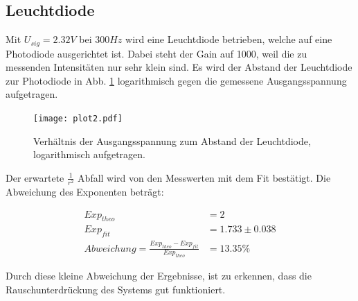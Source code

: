 \subsection{Leuchtdiode}
\label{sec:Leuchtdiode}

Mit $U_{sig} = 2.32 V$ bei $300 Hz$ wird eine Leuchtdiode betrieben, welche auf eine Photodiode ausgerichtet ist.
Dabei steht der Gain auf 1000, weil die zu messenden Intensitäten nur sehr klein sind.
Es wird der Abstand der Leuchtdiode zur Photodiode in Abb. \ref{fig:plot2} logarithmisch gegen die gemessene Ausgangsspannung aufgetragen.

\begin{figure}
  \centering
  \texttt{[image: plot2.pdf]}
  \caption{Verhältnis der Ausgangsspannung zum Abstand der Leuchtdiode, logarithmisch aufgetragen.}
  \label{fig:plot2}
\end{figure}

Der erwartete $\frac{1}{r^2}$ Abfall wird von den Messwerten mit dem Fit bestätigt.
Die Abweichung des Exponenten beträgt:

\begin{align*}
  Exp_{theo} &= 2 \\
  Exp_{fit} &= 1.733 \pm 0.038 \\
  Abweichung = \frac{Exp_{theo} - Exp_{fit}}{Exp_{theo}} &= 13.35 \%
\end{align*}

Durch diese kleine Abweichung der Ergebnisse, ist zu erkennen, dass die Rauschunterdrückung des Systems gut funktioniert.
